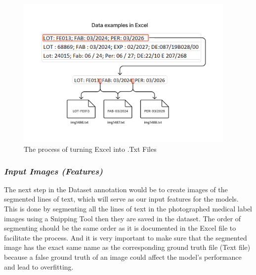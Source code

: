 \begin{figure}[H]
    \centering
    \includegraphics[width=0.95\textwidth]{Figures/Chapter 3/excel_into_files.png}
    \caption{The process of turning Excel into .Txt Files}
    \label{fig:excelintofiles}
\end{figure}
\vspace{-0.5cm}

\subsubsection*{\textit{Input Images (Features)}}
The next step in the Dataset annotation would be to create images of the segmented lines of text, which will serve as our input features for the models.
This is done by segmenting all the lines of text in the photographed medical label images using a Snipping Tool then they are saved in the dataset. The order of segmenting should be the same order as it is documented in the Excel file to facilitate the process. And it is very important to make sure that the segmented image has the exact same name as the corresponding ground truth file (Text file) because a false ground truth of an image could affect the model's performance and lead to overfitting.


